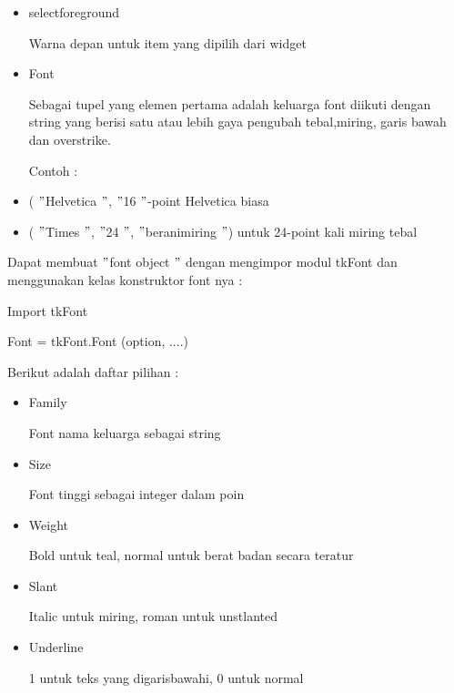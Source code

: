 \documentclass{wileySix}
\begin{document}
\begin{myEnumerate}
\begin{myEnumerate}
{\begin{myEnumerate}
\begin{itemize}
		\noindent 
		\item selectforeground \par
		Warna depan untuk item yang dipilih dari widget \par
		\noindent 
		\item Font \par
		\noindent 
		Sebagai tupel yang elemen pertama adalah keluarga font diikuti dengan string yang berisi satu atau lebih gaya pengubah tebal,miring, garis bawah dan overstrike. \par
		\noindent 
		Contoh : \par
		\noindent 
		\item ( $ " $Helvetica $ " $, $ " $16 $ " $-point Helvetica biasa \par
		\noindent 
		\item ( $ " $Times $ " $, $ " $24 $ " $, $ " $beranimiring $ " $) untuk 24-point kali miring tebal\end{itemize}
	\par
	\vspace{12pt}
	Dapat membuat  $ " $font object $ " $ dengan mengimpor modul tkFont dan menggunakan kelas konstruktor font nya : \par
	Import tkFont \par
	Font = tkFont.Font (option, ....) \par
	\vspace{12pt}
	Berikut adalah daftar pilihan : \par
	\noindent 
	\begin{itemize}
		\item Family \par
		Font nama keluarga sebagai string \par
		\noindent 
		\item Size \par
		Font tinggi sebagai integer dalam poin \par
		\noindent 
		\item Weight \par
		Bold untuk teal, normal untuk berat badan secara teratur \par
		\noindent 
		\item Slant \par
		Italic untuk miring, roman untuk unstlanted \par
		\noindent 
		\item Underline \par
		1 untuk teks yang digarisbawahi, 0 untuk normal \par

\end{itemize}
\end{myEnumerate}}
\end{myEnumerate}
\end{myEnumerate}
\end{document}

